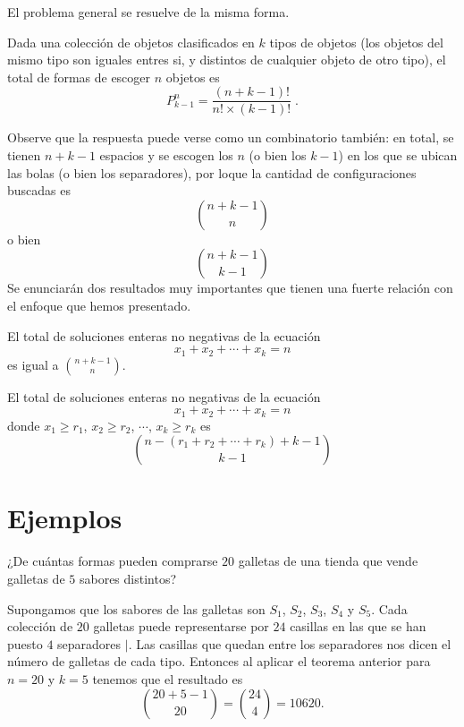 El problema general se resuelve de la misma forma.
\begin{teorema}\label{teo1}
    Dada una colección de objetos clasificados en $k$ tipos de objetos (los objetos del mismo tipo son iguales entres si, y distintos de cualquier objeto de otro tipo), el total de formas de escoger $n$ objetos es
    \[P^{n}_{k-1}=\frac{(n+k-1)!}{n!\times (k-1)!}\;.\]
\end{teorema}
Observe que la respuesta puede verse como un combinatorio también: en total, se tienen $n+k-1$ espacios y se escogen los $n$ (o bien los $k-1$) en los que se ubican las bolas (o bien los separadores), por loque la cantidad de configuraciones buscadas es
\[\binom{n+k-1}{n}\]
o bien
\[\binom{n+k-1}{k-1}\]
Se enunciarán dos resultados muy importantes que tienen una fuerte relación con el enfoque que hemos presentado.
\begin{teorema}\label{teo2}
 El total de soluciones enteras no negativas de la ecuación 
 \[x_1+ x_2+\cdots+x_k=n\]
 es igual a $\displaystyle \binom{n+k-1}{n}$.
\end{teorema}

\begin{teorema}\label{teo3}
El total de soluciones enteras no negativas de la ecuación 
\[x_1+x_2+\cdots+x_k=n\]
donde $x_1\geq r_1$, $x_2\geq r_2$, $\cdots$, $x_k\geq r_k$ es
\[\binom{n-(r_1+r_2+\cdots+r_k)+k-1}{k-1}\]
\end{teorema}
\section{Ejemplos}
\begin{ejemplo}
¿De cuántas formas pueden comprarse $20$ galletas de una tienda que vende galletas de $5$ sabores distintos?
\end{ejemplo}
\begin{solucion}
Supongamos que los sabores de las galletas son $S_1$, $S_2$, $S_3$, $S_4$ y $S_5$. Cada colección de $20$ galletas puede representarse por $24$ casillas en las que se han puesto $4$ separadores $|$. Las casillas que quedan entre los separadores nos dicen el número de galletas de cada tipo. Entonces al aplicar el teorema anterior para $n=20$ y $k=5$ tenemos que el resultado es
\[\binom{20+5-1}{20}=\binom{24}{4}=10620.\]
\end{solucion}

